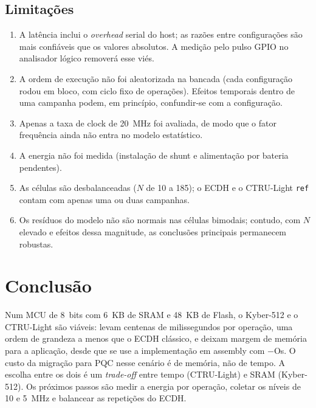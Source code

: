 \documentclass[acmsmall,nonacm,language=english,language=brazilian]{acmart}
\begin{document}
\subsection{Limitações}
\begin{enumerate}
  \item A latência inclui o \emph{overhead} serial do host; as razões entre
        configurações são mais confiáveis que os valores absolutos. A medição
        pelo pulso GPIO no analisador lógico removerá esse viés.
  \item A ordem de execução não foi aleatorizada na bancada (cada
        configuração rodou em bloco, com ciclo fixo de operações). Efeitos
        temporais dentro de uma campanha podem, em princípio, confundir-se
        com a configuração.
  \item Apenas a taxa de clock de 20~MHz foi avaliada, de modo que o fator
        frequência ainda não entra no modelo estatístico.
  \item A energia não foi medida (instalação de shunt e alimentação por bateria
        pendentes).
  \item As células são desbalanceadas ($N$ de 10 a 185); o ECDH e o
        CTRU-Light \texttt{ref} contam com apenas uma ou duas campanhas.
  \item Os resíduos do modelo não são normais nas células bimodais; contudo,
        com $N$ elevado e efeitos dessa magnitude, as conclusões principais
        permanecem robustas.
\end{enumerate}

\section{Conclusão}
\label{sec:concl}
Num MCU de 8~bits com 6~KB de SRAM e 48~KB de Flash, o Kyber-512 e o
CTRU-Light são viáveis: levam centenas de milissegundos por operação, uma
ordem de grandeza a menos que o ECDH clássico, e deixam margem de memória para
a aplicação, desde que se use a implementação em assembly com $-$Os. O
custo da migração para PQC nesse cenário é de memória, não de tempo. A
escolha entre os dois é um \emph{trade-off} entre tempo (CTRU-Light) e SRAM
(Kyber-512). Os próximos passos são medir a energia por operação, coletar os
níveis de 10 e 5~MHz e balancear as repetições do ECDH.

\end{document}
